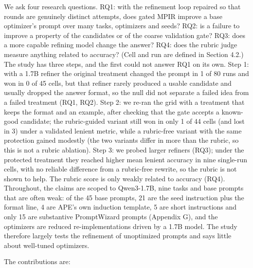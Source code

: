 \documentclass{ieeeaccess}
\begin{document}
We ask four research questions. RQ1: with the refinement loop repaired so that rounds are genuinely distinct attempts, does gated MPIR improve a base optimizer's prompt over many tasks, optimizers and seeds? RQ2: is a failure to improve a property of the candidates or of the coarse validation gate? RQ3: does a more capable refining model change the answer? RQ4: does the rubric judge measure anything related to accuracy? (Cell and run are defined in Section 4.2.) The study has three steps, and the first could not answer RQ1 on its own. Step 1: with a 1.7B refiner the original treatment changed the prompt in 1 of 80 runs and won in 0 of 45 cells, but that refiner rarely produced a usable candidate and usually dropped the answer format, so the null did not separate a failed idea from a failed treatment (RQ1, RQ2). Step 2: we re-ran the grid with a treatment that keeps the format and an example, after checking that the gate accepts a known-good candidate; the rubric-guided variant still won in only 1 of 44 cells (and lost in 3) under a validated lenient metric, while a rubric-free variant with the same protection gained modestly (the two variants differ in more than the rubric, so this is not a rubric ablation). Step 3: we probed larger refiners (RQ3); under the protected treatment they reached higher mean lenient accuracy in nine single-run cells, with no reliable difference from a rubric-free rewrite, so the rubric is not shown to help. The rubric score is only weakly related to accuracy (RQ4). Throughout, the claims are scoped to Qwen3-1.7B, nine tasks and base prompts that are often weak: of the 45 base prompts, 21 are the seed instruction plus the format line, 4 are APE's own induction template, 5 are short instructions and only 15 are substantive PromptWizard prompts (Appendix G), and the optimizers are reduced re-implementations driven by a 1.7B model. The study therefore largely tests the refinement of unoptimized prompts and says little about well-tuned optimizers.

The contributions are:
\end{document}
